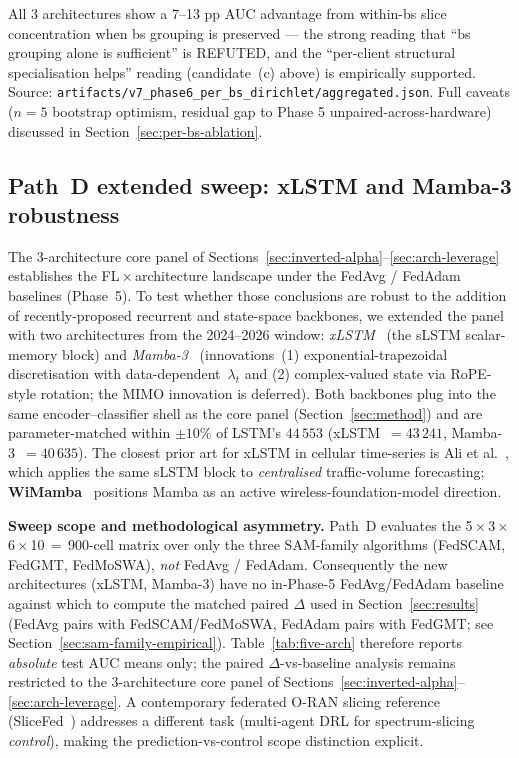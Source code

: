 \documentclass[journal]{IEEEtran}
\begin{document}
All 3 architectures show a 7--13 pp AUC advantage from within-bs slice concentration when bs grouping is preserved --- the strong reading that ``bs grouping alone is sufficient'' is REFUTED, and the ``per-client structural specialisation helps'' reading (candidate~(c) above) is empirically supported. Source: \lstinline|artifacts/v7_phase6_per_bs_dirichlet/aggregated.json|. Full caveats ($n=5$ bootstrap optimism, residual gap to Phase 5 unpaired-across-hardware) discussed in Section~\ref{sec:per-bs-ablation}.


\subsection{Path~D extended sweep: xLSTM and Mamba-3 robustness}\label{sec:path-d-ext}

The 3-architecture core panel of Sections~\ref{sec:inverted-alpha}--\ref{sec:arch-leverage} establishes the FL\,$\times$\,architecture landscape under the FedAvg / FedAdam baselines (Phase~5). To test whether those conclusions are robust to the addition of recently-proposed recurrent and state-space backbones, we extended the panel with two architectures from the 2024--2026 window: \emph{xLSTM}~\cite{Beck2024_xLSTM} (the sLSTM scalar-memory block) and \emph{Mamba-3}~\cite{Lahoti2026_Mamba3} (innovations~(1) exponential-trapezoidal discretisation with data-dependent~$\lambda_t$ and (2) complex-valued state via RoPE-style rotation; the MIMO innovation is deferred). Both backbones plug into the same encoder--classifier shell as the core panel (Section~\ref{sec:method}) and are parameter-matched within $\pm10\%$ of LSTM's $44\,553$ (xLSTM~$=43\,241$, Mamba-3~$=40\,635$). The closest prior art for xLSTM in cellular time-series is Ali et al.~\cite{Ali2025_xLSTMCellular}, which applies the same sLSTM block to \emph{centralised} traffic-volume forecasting; \textbf{WiMamba}~\cite{Raviv2026_WiMamba} positions Mamba as an active wireless-foundation-model direction.

\textbf{Sweep scope and methodological asymmetry.} Path~D evaluates the 5\,$\times$\,3\,$\times$\,6\,$\times$\,10\,$=$\,900-cell matrix over only the three SAM-family algorithms (FedSCAM, FedGMT, FedMoSWA), \emph{not} FedAvg / FedAdam. Consequently the new architectures (xLSTM, Mamba-3) have no in-Phase-5 FedAvg/FedAdam baseline against which to compute the matched paired $\Delta$ used in Section~\ref{sec:results} (FedAvg pairs with FedSCAM/FedMoSWA, FedAdam pairs with FedGMT; see Section~\ref{sec:sam-family-empirical}). Table~\ref{tab:five-arch} therefore reports \emph{absolute} test AUC means only; the paired $\Delta$-vs-baseline analysis remains restricted to the 3-architecture core panel of Sections~\ref{sec:inverted-alpha}--\ref{sec:arch-leverage}. A contemporary federated O-RAN slicing reference (SliceFed~\cite{Mohammadi2026_SliceFed}) addresses a different task (multi-agent DRL for spectrum-slicing \emph{control}), making the prediction-vs-control scope distinction explicit.
\end{document}
